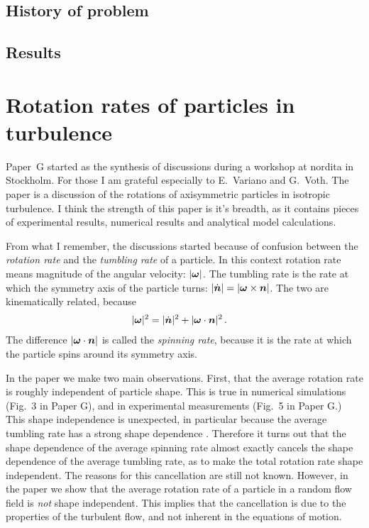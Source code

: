 \documentclass[thesis.tex]{subfiles}
\begin{document}
\section{History of problem}




\section{Results}

\chapter{Rotation rates of particles in turbulence}
Paper~G started as the synthesis of discussions during a workshop at {\sc nordita} in Stockholm. For those I am grateful especially to E.~Variano and G.~Voth. The paper is a discussion of the rotations of axisymmetric particles in isotropic turbulence. I think the strength of this paper is it's breadth, as it contains pieces of experimental results, numerical results and analytical model calculations.

From what I remember, the discussions started because of confusion between the \emph{rotation rate} and the \emph{tumbling rate} of a particle. In this context rotation rate means magnitude of the angular velocity: $|\mbox{\boldmath$\omega$}|$. The tumbling rate is the rate at which the symmetry axis of the particle turns: $|\dot{\mbox{\boldmath$n$}}|=|\mbox{\boldmath$\omega$} \times \mbox{\boldmath$n$}|$. The two are kinematically related, because
\begin{align}
    |\mbox{\boldmath$\omega$}|^2 &= |\dot{\mbox{\boldmath$n$}}|^2 + |\mbox{\boldmath$\omega$} \cdot \mbox{\boldmath$n$}|^2\,.
\end{align}
The difference $|\mbox{\boldmath$\omega$} \cdot \mbox{\boldmath$n$}|$ is called the \emph{spinning rate}, because it is the rate at which the particle spins around its symmetry axis.

In the paper we make two main observations. First, that the average rotation rate is roughly independent of particle shape. This is true in numerical simulations (Fig.~3 in Paper G), and in experimental measurements (Fig.~5 in Paper G.) This shape independence is unexpected, in particular because the average tumbling rate has a strong shape dependence \cite{parsa2012,gustavsson2014}. Therefore it turns out that the shape dependence of the average spinning rate almost exactly cancels the shape dependence of the average tumbling rate, as to make the total rotation rate shape independent. The reasons for this cancellation are still not known. However, in the paper we show that the average rotation rate of a particle in a random flow field is \emph{not} shape independent. This implies that the cancellation is due to the properties of the turbulent flow, and not inherent in the equations of motion.
\end{document}
